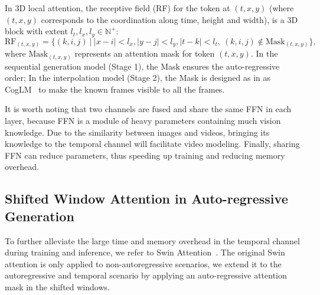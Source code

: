 In 3D local attention, the receptive field (RF) for the token at $(t, x, y)$ 
(where $(t, x, y)$ corresponds to the coordination along time, height and width), is a 3D block with extent $l_t, l_x, l_y \in \mathbb{N}^+$:
\begin{equation}
    \text{RF}_{(t, x, y)} = \{(k,i,j) ~ \Big\vert ~ \lvert x-i \rvert < l_x, \lvert y-j \rvert < l_y,  \lvert t-k \rvert < l_t, ~(k, i, j) \notin \text{Mask}_{(t, x, y)} \}, 
\end{equation}
where $\text{Mask}_{(t, x, y)}$ represents an attention mask for token $(t, x, y)$. In the sequential generation model (Stage 1), the Mask ensures the auto-regressive order; In the interpolation model (Stage 2), the Mask is designed as in as CogLM~\cite{ding2022cogview2} to make the known frames visible to all the frames. 


It is worth noting that two channels are fused and share the same FFN in each layer, 
because FFN is a module of heavy parameters containing much vision knowledge. Due to the similarity between images and videos, bringing its knowledge to the temporal channel will facilitate video modeling. Finally, sharing FFN can reduce parameters, thus speeding up training and reducing memory overhead. 

\subsection{Shifted Window Attention in Auto-regressive Generation} \label{subsec: swin}
To further alleviate the large time and memory overhead in the temporal channel during training and inference, we refer to Swin Attention~\cite{liu2021swin}. 
The original Swin attention is only applied to non-autoregressive scenarios, we extend it to the autoregressive and temporal scenario by applying an auto-regressive attention mask in the shifted windows. 

